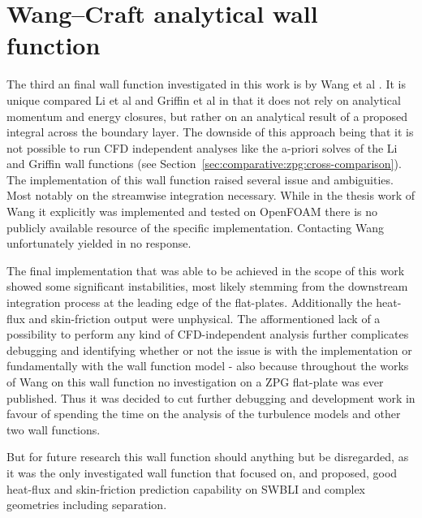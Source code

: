 \section{Wang--Craft analytical wall function}
\label{sec:wall-functions:wang-craft}

The third an final wall function investigated in this work is by Wang et al \cite{wang2023WF}. It is unique compared Li et al and Griffin et al in that it does not rely on analytical momentum and energy closures, but rather on an analytical result of a proposed integral across the boundary layer. The downside of this approach being that it is not possible to run CFD independent analyses like the a-priori solves of the Li and Griffin wall functions (see Section~\ref{sec:comparative:zpg:cross-comparison}).
The implementation of this wall function raised several issue and ambiguities. Most notably on the streamwise integration necessary. While in the thesis work of Wang \cite{wang2019Thesis} it explicitly was implemented and tested on OpenFOAM there is no publicly available resource of the specific implementation. Contacting Wang unfortunately yielded in no response.
\par\medskip

The final implementation that was able to be achieved in the scope of this work showed some significant instabilities, most likely stemming from the downstream integration process at the leading edge of the flat-plates. Additionally the heat-flux and skin-friction output were unphysical. The afformentioned lack of a possibility to perform any kind of CFD-independent analysis further complicates debugging and identifying whether or not the issue is with the implementation or fundamentally with the wall function model - also because throughout the works of Wang on this wall function no investigation on a ZPG flat-plate was ever published. Thus it was decided to cut further debugging and development work in favour of spending the time on the analysis of the turbulence models and other two wall functions. 
\par\medskip

But for future research this wall function should anything but be disregarded, as it was the only investigated wall function that focused on, and proposed, good heat-flux and skin-friction prediction capability on SWBLI and complex geometries including separation.